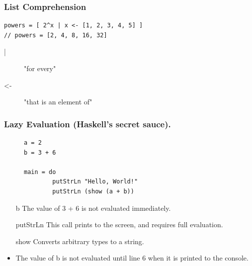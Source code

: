 \documentclass{beamer}
\begin{document}
    \begin{frame}[fragile=singleslide]
        \frametitle{List Comprehension}

        \begin{lstlisting}
powers = [ 2^x | x <- [1, 2, 3, 4, 5] ]
// powers = [2, 4, 8, 16, 32]
        \end{lstlisting}
        
        \begin{description}
            \item[|] "for every"
            \item[<-] "that is an element of"
        \end{description}
    \end{frame}

    \begin{frame}[fragile=singleslide]
        \frametitle{Lazy Evaluation (Haskell's secret sauce).}

        \begin{figure}
            \begin{lstlisting}
a = 2
b = 3 + 6

main = do
        putStrLn "Hello, World!"
        putStrLn (show (a + b))
            \end{lstlisting}
        \end{figure}
        \begin{itemize}
            \item[b] The value of 3 + 6 is not evaluated immediately.
            \item[putStrLn] This call prints to the screen, and requires full evaluation.
            \item[show] Converts arbitrary types to a string.
            \item The value of b is not evaluated until line 6 when it is printed to the console.
        \end{itemize}
    \end{frame}
\end{document}
